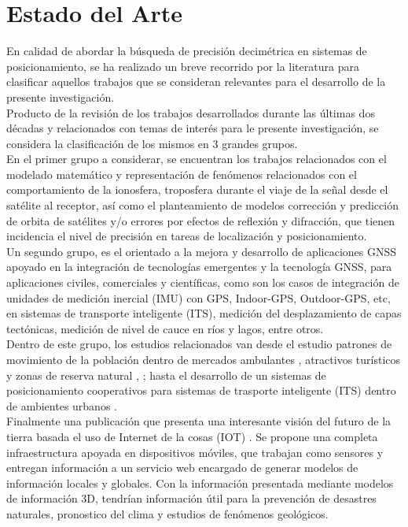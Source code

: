 \chapter{Estado del Arte}
\label{sec:estadodelarte}

En calidad de abordar la búsqueda de precisión decimétrica en sistemas de posicionamiento, se ha realizado un breve recorrido por la literatura para clasificar aquellos trabajos que se consideran relevantes para el desarrollo de la presente investigación.\\ 

Producto de la revisión de los trabajos desarrollados durante las últimas dos décadas y relacionados con temas de interés para le presente investigación, se considera la clasificación de los mismos en 3 grandes grupos. \\

En el primer grupo a considerar, se encuentran los trabajos relacionados con el modelado matemático y representación de fenómenos relacionados con el comportamiento de la ionosfera, troposfera durante el viaje de la señal desde el satélite al receptor, así como el planteamiento de modelos corrección y predicción de orbita de satélites y/o errores por efectos de reflexión y difracción, que tienen incidencia el nivel de precisión en tareas de localización y posicionamiento. \\

Un segundo grupo, es el orientado a la mejora y desarrollo de aplicaciones GNSS apoyado en la integración de tecnologías emergentes y la tecnología GNSS, para aplicaciones civiles, comerciales y científicas, como son los casos de integración de unidades de medición inercial (IMU) con GPS, Indoor-GPS, Outdoor-GPS, etc, en sistemas de transporte inteligente (ITS), medición del desplazamiento de capas tectónicas, medición de nivel de cauce en ríos y lagos, entre otros.\\

Dentro de este grupo, los estudios relacionados van desde el estudio patrones de movimiento de la población dentro de mercados ambulantes \cite{Tsang_2011}, atractivos turísticos y zonas de reserva natural \cite{Meijles_2014}, \cite{Orellana_2012}; hasta el desarrollo de un sistemas de posicionamiento cooperativos para sistemas de trasporte inteligente (ITS) dentro de ambientes urbanos \cite{Tang_2014}.\\

Finalmente una publicación que presenta una interesante visión del futuro de la tierra basada el uso de Internet de la cosas (IOT) \cite{Li_2014}. Se propone una completa infraestructura apoyada en dispositivos móviles, que trabajan como sensores y entregan información a un servicio web encargado de generar modelos de información locales y globales. Con la información presentada mediante modelos de información 3D, tendrían información útil para la prevención de desastres naturales, pronostico del clima y estudios de fenómenos geológicos.\\  

